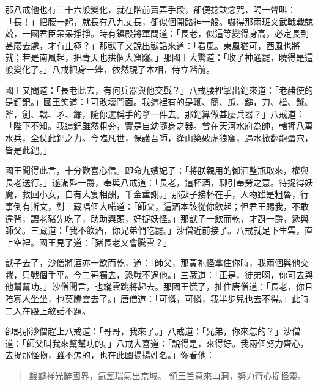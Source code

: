 那八戒他也有三十六般變化，就在階前賣弄手段，卻便捻訣念咒，喝一聲叫：「長！」把腰一躬，就長有八九丈長，卻似個開路神一般。嚇得那兩班文武戰戰兢兢，一國君臣呆呆掙掙。時有鎮殿將軍問道：「長老，似這等變得身高，必定長到甚麼去處，才有止極？」那獃子又說出獃話來道：「看風。東風猶可，西風也將就；若是南風起，把青天也拱個大窟窿。」那國王大驚道：「收了神通罷，曉得是這般變化了。」八戒把身一矬，依然現了本相，侍立階前。

國王又問道：「長老此去，有何兵器與他交戰？」八戒腰裡掣出鈀來道：「老豬使的是釘鈀。」國王笑道：「可敗壞門面。我這裡有的是鞭、簡、瓜、鎚，刀、槍、鉞、斧，劍、戟、矛、鐮，隨你選稱手的拿一件去。那鈀算做甚麼兵器？」八戒道：「陛下不知。我這鈀雖然粗夯，實是自幼隨身之器。曾在天河水府為帥，轄押八萬水兵，全仗此鈀之力。今臨凡世，保護吾師，逢山築破虎狼窩，遇水掀翻龍蜃穴，皆是此鈀。」

國王聞得此言，十分歡喜心信。即命九嬪妃子：「將朕親用的御酒整瓶取來，權與長老送行。」遂滿斟一爵，奉與八戒道：「長老，這杯酒，聊引奉勞之意。待捉得妖魔，救回小女，自有大宴相酬，千金重謝。」那獃子接杯在手，人物雖是粗魯，行事倒有斯文，對三藏唱個大喏道：「師父，這酒本該從你飲起；但君王賜我，不敢違背，讓老豬先吃了，助助興頭，好捉妖怪。」那獃子一飲而乾，才斟一爵，遞與師父。三藏道：「我不飲酒，你兄弟們吃罷。」沙僧近前接了。八戒就足下生雲，直上空裡。國王見了道：「豬長老又會騰雲？」

獃子去了，沙僧將酒亦一飲而乾，道：「師父，那黃袍怪拿住你時，我兩個與他交戰，只戰個手平。今二哥獨去，恐戰不過他。」三藏道：「正是，徒弟啊，你可去與他幫幫功。」沙僧聞言，也縱雲跳將起去。那國王慌了，扯住唐僧道：「長老，你且陪寡人坐坐，也莫騰雲去了。」唐僧道：「可憐，可憐，我半步兒也去不得。」此時二人在殿上敘話不題。

卻說那沙僧趕上八戒道：「哥哥，我來了。」八戒道：「兄弟，你來怎的？」沙僧道：「師父叫我來幫幫功的。」八戒大喜道：「說得是，來得好。我兩個努力齊心，去捉那怪物，雖不怎的，也在此國揚揚姓名。」你看他：
\begin{quote}
靉靆祥光辭國界，氤氳瑞氣出京城。
領王旨意來山洞，努力齊心捉怪靈。
\end{quote}

